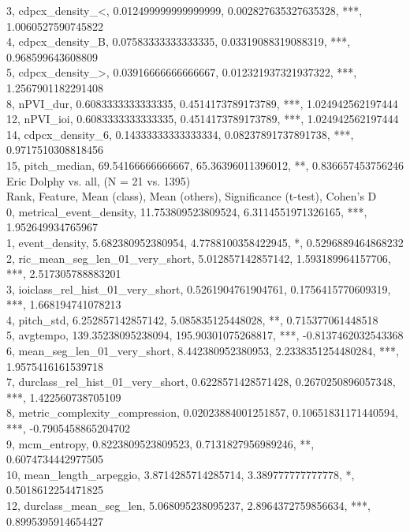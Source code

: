 3, cdpcx_density_<, 0.012499999999999999, 0.002827635327635328, ***, 1.0060527590745822\\
4, cdpcx_density_B, 0.07583333333333335, 0.03319088319088319, ***, 0.968599643608809\\
5, cdpcx_density_>, 0.03916666666666667, 0.012321937321937322, ***, 1.2567901182291408\\
8, nPVI_dur, 0.6083333333333335, 0.4514173789173789, ***, 1.024942562197444\\
12, nPVI_ioi, 0.6083333333333335, 0.4514173789173789, ***, 1.024942562197444\\
14, cdpcx_density_6, 0.14333333333333334, 0.08237891737891738, ***, 0.9717510308818456\\
15, pitch_median, 69.54166666666667, 65.36396011396012, **, 0.836657453756246\\
Eric Dolphy vs. all, (N = 21 vs. 1395)\\
Rank, Feature, Mean (class), Mean (others), Significance (t-test), Cohen's D\\
0, metrical_event_density, 11.753809523809524, 6.3114551971326165, ***, 1.952649934765967\\
1, event_density, 5.682380952380954, 4.7788100358422945, *, 0.5296889464868232\\
2, ric_mean_seg_len_01_very_short, 5.012857142857142, 1.593189964157706, ***, 2.517305788883201\\
3, ioiclass_rel_hist_01_very_short, 0.5261904761904761, 0.1756415770609319, ***, 1.668194741078213\\
4, pitch_std, 6.252857142857142, 5.085835125448028, **, 0.715377061448518\\
5, avgtempo, 139.35238095238094, 195.90301075268817, ***, -0.8137462032543368\\
6, mean_seg_len_01_very_short, 8.442380952380953, 2.2338351254480284, ***, 1.9575416161539718\\
7, durclass_rel_hist_01_very_short, 0.6228571428571428, 0.2670250896057348, ***, 1.422560738705109\\
8, metric_complexity_compression, 0.02023884001251857, 0.10651831171440594, ***, -0.7905458865204702\\
9, mcm_entropy, 0.8223809523809523, 0.7131827956989246, **, 0.6074734442977505\\
10, mean_length_arpeggio, 3.8714285714285714, 3.389777777777778, *, 0.5018612254471825\\
12, durclass_mean_seg_len, 5.068095238095237, 2.8964372759856634, ***, 0.8995395914654427\\
